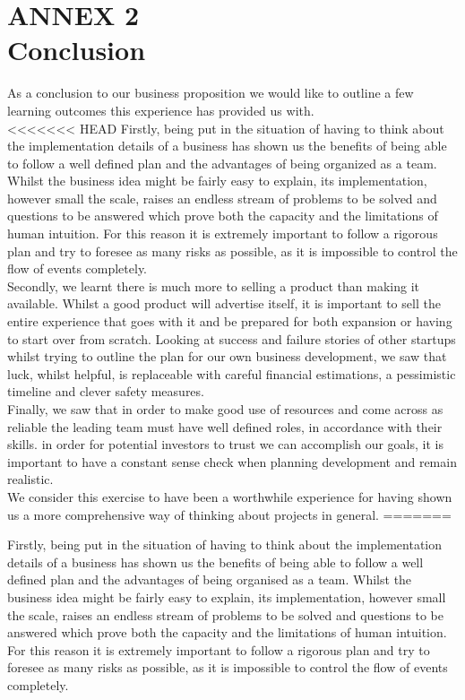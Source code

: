 \documentclass[11pt]{article}
\begin{document}
\section{ANNEX 2 \\ Conclusion}
As a conclusion to our business proposition we would like to outline a few learning outcomes this experience has provided us with.\\
<<<<<<< HEAD
Firstly, being put in the situation of having to think about the implementation details of a business has shown us the benefits of being able to follow a well defined plan and the advantages of being organized as a team. Whilst the business idea might be fairly easy to explain, its implementation, however small the scale, raises an endless stream of problems to be solved and questions to be answered which prove both the capacity and the limitations of human intuition. For this reason it is extremely important to follow a rigorous plan and try to foresee as many risks as possible, as it is impossible to control the flow of events completely. \\
Secondly, we learnt there is much more to selling a product than making it available. Whilst a good product will advertise itself, it is important to sell the entire experience that goes with it and be prepared for both expansion or having to start over from scratch. Looking at success and failure stories of other startups whilst trying to outline the plan for our own business development, we saw that luck, whilst helpful, is replaceable with careful financial estimations, a pessimistic timeline and clever safety measures. \\
Finally, we saw that in order to make good use of resources and come across as reliable the leading team must have well defined roles, in accordance with their skills. in order for potential investors to trust we can accomplish our goals, it is important to have a constant sense check when planning development and remain realistic.\\
We consider this exercise to have been a worthwhile experience for having shown us a more comprehensive way of thinking about projects in general.
=======

\noindent Firstly, being put in the situation of having to think about the implementation details of a business has shown us the benefits of being able to follow a well defined plan and the advantages of being organised as a team. Whilst the business idea might be fairly easy to explain, its implementation, however small the scale, raises an endless stream of problems to be solved and questions to be answered which prove both the capacity and the limitations of human intuition. For this reason it is extremely important to follow a rigorous plan and try to foresee as many risks as possible, as it is impossible to control the flow of events completely. \\
\end{document}
